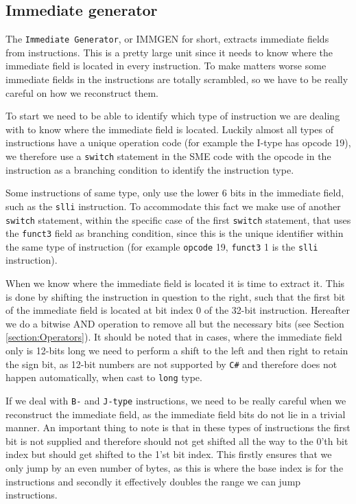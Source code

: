     
    \subsection{Immediate generator}\label{section:immediategenerator}
        The \texttt{Immediate Generator}, or IMMGEN for short, extracts immediate fields from instructions. This is a pretty large unit since it needs to know where the immediate field is located in every instruction. To make matters worse some immediate fields in the instructions are totally scrambled, so we have to be really careful on how we reconstruct them.
        
        To start we need to be able to identify which type of instruction we are dealing with to know where the immediate field is located. Luckily almost all types of instructions have a unique operation code (for example the I-type has opcode 19), we therefore use a \texttt{switch} statement in the SME code with the opcode in the instruction as a branching condition to identify the instruction type.
        
        Some instructions of same type, only use the lower 6 bits in the immediate field, such as the \texttt{slli} instruction. To accommodate this fact we make use of another \texttt{switch} statement, within the specific case of the first \texttt{switch} statement, that uses the \texttt{funct3} field as branching condition, since this is the unique identifier within the same type of instruction (for example \texttt{opcode} 19, \texttt{funct3} 1 is the \texttt{slli} instruction).
        
        When we know where the immediate field is located it is time to extract it. This is done by shifting the instruction in question to the right, such that the first bit of the immediate field is located at bit index 0 of the 32-bit instruction. Hereafter we do a bitwise AND operation to remove all but the necessary bits (see Section \ref{section:Operators}). It should be noted that in cases, where the immediate field only is 12-bits long we need to perform a shift to the left and then right to retain the sign bit, as 12-bit numbers are not supported by \texttt{C\#} and therefore does not happen automatically, when cast to \texttt{long} type.
        
        If we deal with \texttt{B-} and \texttt{J-type} instructions, we need to be really careful when we reconstruct the immediate field, as the immediate field bits do not lie in a trivial manner. An important thing to note is that in these types of instructions the first bit is not supplied and therefore should not get shifted all the way to the 0'th bit index but should get shifted to the 1'st bit index. This firstly ensures that we only jump by an even number of bytes, as this is where the base index is for the instructions and secondly it effectively doubles the range we can jump instructions.
        
